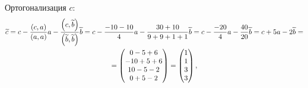 \documentclass[12pt]{article}
\begin{document}
    Ортогонализация $c$:
    \begin{multline*}
        \widetilde{c}
        = c - \frac{\left ( c, a \right )}{\left ( a, a \right )} a - \frac{\left ( c, \widetilde{b} \right )}{\left ( \widetilde{b}, \widetilde{b} \right )} \widetilde{b}
        = c - \frac{-10 - 10}{4} a - \frac{30 + 10}{9 + 9 + 1 + 1} \widetilde{b}
        = c - \frac{-20}{4} a - \frac{40}{20} \widetilde{b}
        = c + 5 a - 2 \widetilde{b} = \\
        =
        \begin{pmatrix}
            0 - 5 + 6   \\
            -10 + 5 + 6 \\
            10 - 5 - 2  \\
            0 + 5 - 2
        \end{pmatrix}
        =
        \begin{pmatrix}
            1 \\
            1 \\
            3 \\
            3
        \end{pmatrix},
    \end{multline*}
\end{document}

